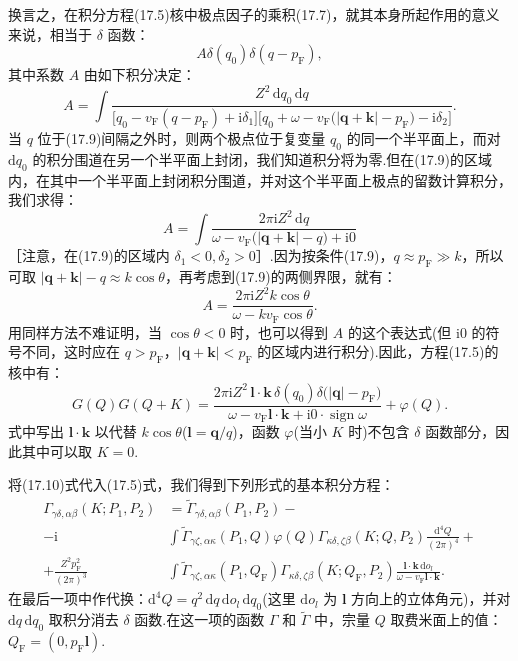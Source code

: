 换言之，在积分方程(17.5)核中极点因子的乘积(17.7)，就其本身所起作用的意义来说，相当于 $\delta$ 函数：
\begin{equation*}
  A\delta(q_0)\delta(q-p_{\mathrm{F}}),
\end{equation*}
其中系数 $A$ 由如下积分决定：
\begin{equation*}
  A=\int\frac{Z^2\,\mathrm{d}q_0\,\mathrm{d}q}{\bigl[q_0-v_{\mathrm{F}}(q-p_{\mathrm{F}})+\mathrm{i}\delta_1\bigr]\bigl[q_0+\omega-v_{\mathrm{F}}\bigl(|\bm{q}+\bm{k}|-p_{\mathrm{F}}\bigr)-\mathrm{i}\delta_2\bigr]}.
\end{equation*}
当 $q$ 位于(17.9)间隔之外时，则两个极点位于复变量 $q_0$ 的同一个半平面上，而对 $\mathrm{d}q_0$ 的积分围道在另一个半平面上封闭，我们知道积分将为零.但在(17.9)的区域内，在其中一个半平面上封闭积分围道，并对这个半平面上极点的留数计算积分，我们求得：
\begin{equation*}
  A=\int\frac{2\pi\mathrm{i}Z^2\,\mathrm{d}q}{\omega-v_{\mathrm{F}}\bigl(|\bm{q}+\bm{k}|-q\bigr)+\mathrm{i}0}
\end{equation*}
［注意，在(17.9)的区域内 $\delta_1<0,\delta_2>0$］.因为按条件(17.9)，$q\approx p_{\mathrm{F}}\gg k$，所以可取 $|\bm{q}+\bm{k}|-q\approx k\cos\theta$，再考虑到(17.9)的两侧界限，就有：
\begin{equation*}
  A=\frac{2\pi\mathrm{i}Z^2k\cos\theta}{\omega-kv_{\mathrm{F}}\cos\theta}.
\end{equation*}
用同样方法不难证明，当 $\cos\theta<0$ 时，也可以得到 $A$ 的这个表达式(但 i0 的符号不同，这时应在 $q>p_{\mathrm{F}}$，$|\bm{q}+\bm{k}|<p_{\mathrm{F}}$ 的区域内进行积分).因此，方程(17.5)的核中有：
\begin{equation}
  G(Q)G(Q+K)=\frac{2\pi\mathrm{i}Z^2\,\bm{l}\cdot\bm{k}\,\delta(q_0)\delta\bigl(|\bm{q}|-p_{\mathrm{F}}\bigr)}{\omega-v_{\mathrm{F}}\bm{l}\cdot\bm{k}+\mathrm{i}0\cdot\operatorname{sign}\omega}+\varphi(Q).
\end{equation}
式中写出 $\bm{l}\cdot\bm{k}$ 以代替 $k\cos\theta$($\bm{l}=\bm{q}/q$)，函数 $\varphi$(当小 $K$ 时)不包含 $\delta$ 函数部分，因此其中可以取 $K=0$.

将(17.10)式代入(17.5)式，我们得到下列形式的基本积分方程：
\begin{equation}
\begin{aligned}
  \Gamma_{\gamma\delta,\alpha\beta}(K;P_1,P_2)&=\tilde{\Gamma}_{\gamma\delta,\alpha\beta}(P_1,P_2)-\\
  -\mathrm{i}&\int\tilde{\Gamma}_{\gamma\zeta,\alpha\kappa}(P_1,Q)\varphi(Q)\Gamma_{\kappa\delta,\zeta\beta}(K;Q,P_2)\frac{\mathrm{d}^4Q}{(2\pi)^4}+\\
  +\frac{Z^2p_{\mathrm{F}}^2}{(2\pi)^3}&\int\tilde{\Gamma}_{\gamma\zeta,\alpha\kappa}(P_1,Q_{\mathrm{F}})\Gamma_{\kappa\delta,\zeta\beta}(K;Q_{\mathrm{F}},P_2)\frac{\bm{l}\cdot\bm{k}\,\mathrm{d}o_l}{\omega-v_{\mathrm{F}}\bm{l}\cdot\bm{k}}.
\end{aligned}
\end{equation}
在最后一项中作代换：$\mathrm{d}^4Q=q^2\,\mathrm{d}q\,\mathrm{d}o_l\,\mathrm{d}q_0$(这里 $\mathrm{d}o_l$ 为 $\bm l$ 方向上的立体角元)，并对 $\mathrm{d}q\,\mathrm{d}q_0$ 取积分消去 $\delta$ 函数.在这一项的函数 $\Gamma$ 和 $\tilde{\Gamma}$ 中，宗量 $Q$ 取费米面上的值：$Q_{\mathrm{F}}=(0,p_{\mathrm{F}}\bm{l})$.

